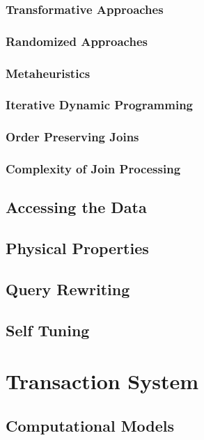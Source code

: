 \documentclass[11pt]{article}
\begin{document}
\subsubsection{Transformative Approaches}
\label{sec:orge148af1}
\subsubsection{Randomized Approaches}
\label{sec:org1fad68c}
\subsubsection{Metaheuristics}
\label{sec:org36893f1}
\subsubsection{Iterative Dynamic Programming}
\label{sec:orgd74f8f3}
\subsubsection{Order Preserving Joins}
\label{sec:orgc6f6829}
\subsubsection{Complexity of Join Processing}
\label{sec:orgcf294d8}
\subsection{Accessing the Data}
\label{sec:org264c3b4}

\subsection{Physical Properties}
\label{sec:orgb748054}

\subsection{Query Rewriting}
\label{sec:orgc40a8a3}

\subsection{Self Tuning}
\label{sec:orgfc8c880}
\section{Transaction System}
\label{sec:org45c2df0}
\subsection{Computational Models}
\label{sec:org55696af}
\end{document}

